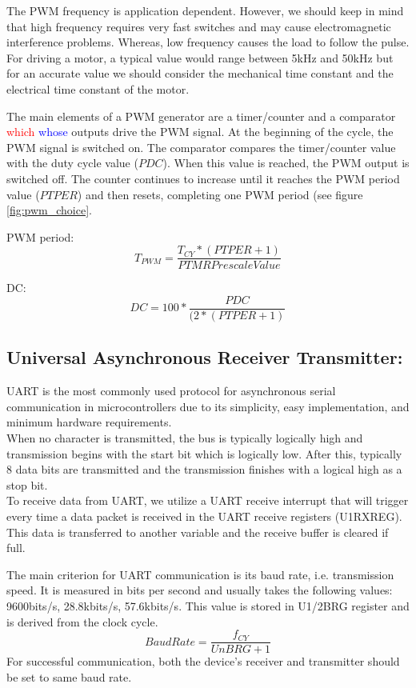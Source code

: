 The PWM frequency is application dependent. However, we should keep in mind that high frequency requires very fast switches and may cause electromagnetic interference problems. Whereas, low frequency causes the load to follow the pulse.\\
For driving a motor, a typical value would range between 5kHz and 50kHz but for an accurate value we should consider the mechanical time constant and the electrical time constant of the motor.


The main elements of a PWM generator are a timer/counter and a comparator \textcolor{red}{which} \textcolor{blue}{whose} outputs drive the PWM signal. At the beginning of the cycle, the PWM signal is switched on. The comparator compares the timer/counter value with the duty cycle value ($PDC$). When this value is reached, the PWM output is switched off. The counter continues to increase until it reaches the PWM period value ($PTPER$) and then resets, completing one PWM period (see figure \ref{fig:pwm_choice}.

PWM period:
$$T_{PWM}=\frac{T_{CY}*(PTPER+1)}{PTMR Prescale Value}$$

DC: 
$$DC=100* \frac{PDC}{(2*(PTPER+1)}$$


\subsection{Universal Asynchronous Receiver Transmitter:}

UART is the most commonly used protocol for asynchronous serial communication in microcontrollers due to its simplicity, easy implementation, and minimum hardware requirements.\\
When no character is transmitted, the bus is typically logically high and transmission begins with the start bit which is logically low. After this, typically 8 data bits are transmitted and the transmission finishes with a logical high as a stop bit.\\
To receive data from UART, we utilize a UART receive interrupt that will trigger every time a data packet is received in the UART receive registers (U1RXREG). This data is transferred to another variable and the receive buffer is cleared if full.

The main criterion for UART communication is its baud rate, i.e. transmission speed. It is measured in bits per second and usually takes the following values: 9600bits/s, 28.8kbits/s, 57.6kbits/s.
This value is stored in U1/2BRG register and is derived from the clock cycle.
$$BaudRate = \frac{f_{CY}}{UnBRG+1}$$
For successful communication, both the device’s receiver and transmitter should be set to same baud rate.


